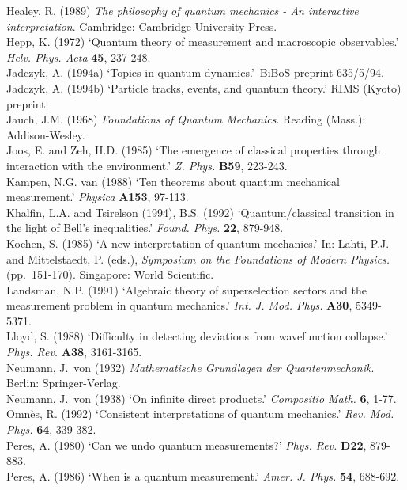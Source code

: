 Healey, R. (1989) {\em The philosophy of quantum mechanics - An interactive
interpretation}.
Cambridge: Cambridge  University Press.\\
 Hepp, K. (1972)  `Quantum theory of measurement and macroscopic
observables.' {\em Helv. Phys. Acta} {\bf 45},  237-248.\\
Jadczyk, A. (1994a) `Topics in quantum dynamics.'\ BiBoS preprint 635/5/94.\\
Jadczyk, A. (1994b) `Particle tracks, events, and quantum theory.' RIMS (Kyoto)
preprint.\\
 Jauch, J.M. (1968) {\em Foundations of Quantum Mechanics}.
 Reading (Mass.): Addison-Wesley.\\
 Joos, E. and Zeh, H.D.  (1985) `The emergence of classical properties
through interaction with the environment.' {\em Z. Phys.} {\bf B59}, 223-243.\\
Kampen, N.G. van (1988) `Ten theorems about quantum mechanical
measurement.'  {\em  Physica} {\bf A153},  97-113.\\
  Khalfin, L.A. and  Tsirelson (1994), B.S. (1992)  `Quantum/classical
transition in the light of Bell's
inequalities.'  {\em Found. Phys.} {\bf 22},  879-948.\\
Kochen,  S. (1985) `A new interpretation of quantum mechanics.' In:
Lahti,  P.J. and Mittelstaedt,  P. (eds.), {\em  Symposium on the Foundations
of Modern Physics.}
(pp.\ 151-170).  Singapore: World Scientific.\\
  Landsman, N.P. (1991)  `Algebraic theory of superselection sectors and the
measurement problem
in quantum mechanics.' {\em Int. J. Mod. Phys.} {\bf A30},  5349-5371.\\
 Lloyd, S. (1988)  `Difficulty in detecting deviations from wavefunction
collapse.'
 {\em Phys. Rev.} {\bf A38},  3161-3165.\\
 Neumann, J.~von (1932) {\em Mathematische Grundlagen der
Quantenmechanik}.  Berlin: Springer-Verlag.\\
 Neumann, J.~von (1938) `On infinite direct products.' {\em Compositio Math.}
{\bf 6}, 1-77.\\
  Omn\`{e}s, R. (1992)
`Consistent interpretations of quantum mechanics.' {\em Rev. Mod. Phys.} {\bf
64},  339-382.\\
  Peres, A. (1980) `Can we undo quantum measurements?' {\em Phys. Rev.} {\bf
D22},  879-883.\\
  Peres, A. (1986) `When is a quantum measurement.' {\em  Amer. J. Phys.} {\bf
54},  688-692.\\
